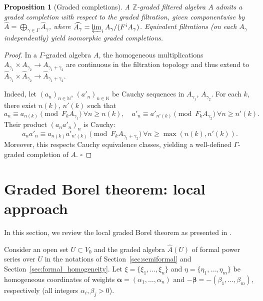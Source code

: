 \documentclass[a4paper,12pt]{amsart}
\newtheorem{proposition}{Proposition}
\begin{document}
\begin{proposition}[Graded completions]\label{prop:graded-completion}\normalfont
A $\mathbb{Z}$-graded filtered algebra $A$ admits a \emph{graded completion} with respect to the graded filtration, given componentwise by $\widehat{A} = \bigoplus_{\gamma\in\Gamma} \widehat{A}_\gamma$, where $\widehat{A_\gamma}=\varprojlim_i A_\gamma/(F^i A_\gamma)$. Equivalent filtrations (on each $A_\gamma$ independently) yield isomorphic graded completions.
\end{proposition}

\noindent\begin{proof}
In a $\Gamma$-graded algebra $A$, the homogeneous multiplications $A_{\gamma_1}\times A_{\gamma_2}\to A_{\gamma_1+\gamma_2}$ are continuous in the filtration topology and thus extend to $\widehat{A}_{\gamma_1}\times\widehat{A}_{\gamma_2}\to\widehat{A}_{\gamma_1+\gamma_2}$.

\noindent
Indeed, let $(a_n)_{n\in\mathbb{N}}$, $(a'_n)_{n\in\mathbb{N}}$ be Cauchy sequences in $A_{\gamma_1}$, $A_{\gamma_2}$. For each $k$, there exist $n(k)$, $n'(k)$ such that
\[
a_n\equiv a_{n(k)}\pmod{F_kA_{\gamma_1}}\ \forall n\ge n(k), \quad a'_n\equiv a'_{n'(k)}\pmod{F_kA_{\gamma_2}}\ \forall n\ge n'(k).
\]
Their product $(a_na'_n)_n$ is Cauchy:
\[
a_na'_n\equiv a_{n(k)}a'_{n'(k)}\pmod{F_kA_{\gamma_1+\gamma_2}}\ \forall n\ge\max(n(k),n'(k)).
\]
Moreover, this respects Cauchy equivalence classes, yielding a well-defined $\Gamma$-graded completion of $A$.  $\square$
\end{proof}




\section{Graded Borel theorem: local approach}\label{sec:local_Borel}

\noindent In this section, we review the local graded Borel theorem as presented in \cite{KS2024}.




\smallskip\noindent
Consider an open set $U\subset V_0$ and the graded algebra $\hat{A}(U)$ of formal power series over $U$ in the notations of Section~\ref{sec:semiformal} and Section~\ref{sec:formal_homogeneity}. Let $\xi=\{\xi_1, \ldots, \xi_n\}$ and $\eta=\{\eta_1, \ldots, \eta_m\}$  be homogeneous coordinates of weights $\bm{\alpha}=(\alpha_1,\ldots,\alpha_n)$ and $-\bm{\beta}=-(\beta_1,\ldots,\beta_m)$, respectively (all integers $\alpha_i,\beta_j>0$). 
\end{document}
